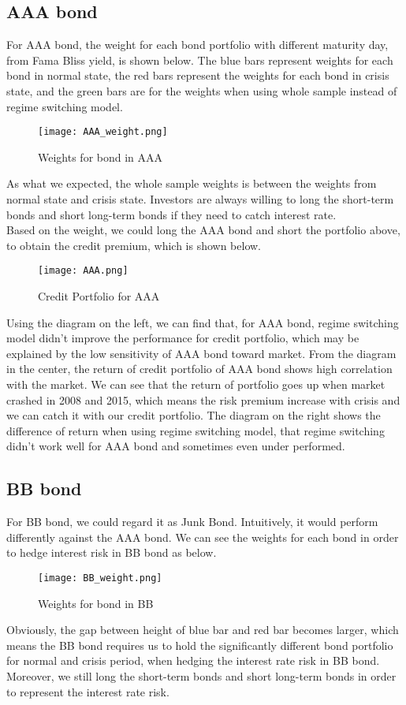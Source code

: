 \documentclass[12pt]{article}
\begin{document}
\subsection{AAA bond}
For AAA bond, the weight for each bond portfolio with different maturity day, from Fama Bliss yield, is shown below. The blue bars represent weights for each bond in normal state, the red bars represent the weights for each bond in crisis state, and the green bars are for the weights when using whole sample instead of regime switching model.
\begin{figure}[H]
\centering
\texttt{[image: AAA\_weight.png]}\\
\caption{Weights for bond in AAA}
\end{figure}
As what we expected, the whole sample weights is between the weights from normal state and crisis state. Investors are always willing to long the short-term bonds and short long-term bonds if they need to catch interest rate.\\

Based on the weight, we could long the AAA bond and short the portfolio above, to obtain the credit premium, which is shown below.

\begin{figure}[H]
\centering
\texttt{[image: AAA.png]}\\
\caption{Credit Portfolio for AAA}
\end{figure}

 Using the diagram on the left, we can find that, for AAA bond, regime switching model didn't improve the performance for credit portfolio, which may be explained by the low sensitivity of AAA bond toward market. From the diagram in the center, the return of credit portfolio of AAA bond shows high correlation with the market. We can see that the return of portfolio goes up when market crashed in 2008 and 2015, which means the risk premium increase with crisis and we can catch it with our credit portfolio. The diagram on the right shows the difference of return when using regime switching model, that regime switching didn't work well for AAA bond and sometimes even under performed. 

\subsection{BB bond}
For BB bond, we could regard it as Junk Bond. Intuitively, it would perform differently against the AAA bond. We can see the weights for each bond in order to hedge interest risk in BB bond as below.
\begin{figure}[H]
\centering
\texttt{[image: BB\_weight.png]}\\
\caption{Weights for bond in BB}
\end{figure}
Obviously, the gap between height of blue bar and red bar becomes larger, which means the BB bond requires us to hold the significantly different bond portfolio for normal and crisis period, when hedging the interest rate risk in BB bond. Moreover, we still long the short-term bonds and short long-term bonds in order to represent the interest rate risk.\\
\end{document}
